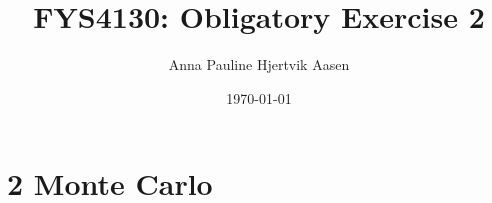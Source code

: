 \documentclass[onecolumn,english,notitlepage]{article}
\title{FYS4130: Obligatory Exercise 2}
\author{Anna Pauline Hjertvik Aasen}
\date{\today}
\begin{document}
\maketitle

\newpage

\section*{2 Monte Carlo}

\end{document}

